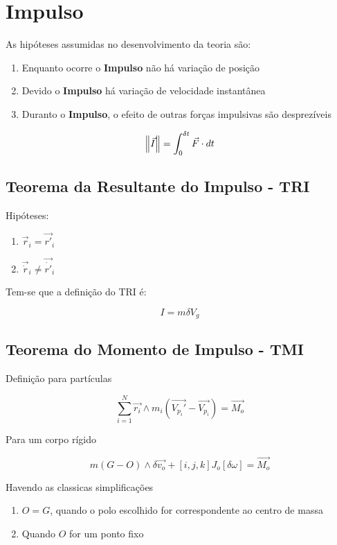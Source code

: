 \section{Impulso}

As hipóteses assumidas no desenvolvimento da teoria são:

\begin{enumerate}
	\item Enquanto ocorre o \textbf{Impulso} não há variação de posição
	\item Devido o \textbf{Impulso} há variação de velocidade instantânea
	\item Duranto o \textbf{Impulso}, o efeito de outras forças impulsivas são desprezíveis
\end{enumerate}

\begin{namedtheorem}
$$ \norm{\vec{I}} = \int_{0}^{\delta t} \vec{F}\cdot dt $$
\end{namedtheorem}

\subsection{Teorema da Resultante do Impulso - TRI}

Hipóteses:

\begin{enumerate}
	\item $\vec{r}_i = \vec{r'}_i$
	\item $\vec{\dot{r}}_i \neq \vec{\dot{r'}}_i$
\end{enumerate}

Tem-se que a definição do TRI é:

$$ \boxed{I = m\delta V_g} $$

\subsection{Teorema do Momento de Impulso - TMI}

Definição para partículas

$$\sum_{i=1}^N \vec{r_i}\wedge m_i(\vec{V_{p_i}'} - \vec{V_{p_i}}) = \vec{M_o}$$

Para um corpo rígido

$$m(G-O)\wedge \delta \vec{v_o} + [i,j,k]J_o[\delta \omega] = \vec{M_o}$$

Havendo as classicas simplificações

\begin{enumerate}
	\item $O=G$, quando o polo escolhido for correspondente ao centro de massa
	\item Quando $O$ for um ponto fixo
\end{enumerate}

